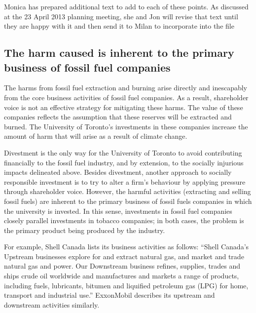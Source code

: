 \begin{vcom}
	Monica has prepared additional text to add to each of these points. As discussed at the 23 April 2013 planning meeting, she and Jon will revise that text until they are happy with it and then send it to Milan to incorporate into the \latex file
\end{vcom}

	\subsection{The harm caused is inherent to the primary business of fossil fuel companies}
	
The harms from fossil fuel extraction and burning arise directly and inescapably from the core business activities of fossil fuel companies.
As a result, shareholder voice is not an effective strategy for mitigating these harms. 
The value of these companies reflects the assumption that these reserves will be extracted and burned.
The University of Toronto's investments in these companies increase the amount of harm that will arise as a result of climate change.



Divestment is the only way for the University of Toronto to avoid contributing financially to the fossil fuel industry, and by extension, to the socially injurious impacts delineated above.
Besides divestment, another approach to socially responsible investment is to try to alter a firm’s behaviour by applying pressure through shareholder voice. 
However, the harmful activities (extracting and selling fossil fuels) are inherent to the primary business of fossil fuels companies in which the university is invested.  
In this sense, investments in fossil fuel companies closely parallel investments in tobacco companies; in both cases, the problem is the primary product being produced by the industry.



For example, Shell Canada lists its business activities as follows: ``Shell Canada's Upstream businesses explore for and extract natural gas, and market and trade natural gas and power. Our Downstream business refines, supplies, trades and ships crude oil worldwide and manufactures and markets a range of products, including fuels, lubricants, bitumen and liquified petroleum gas (LPG) for home, transport and industrial use.'' ExxonMobil describes its upstream and downstream activities similarly.   



